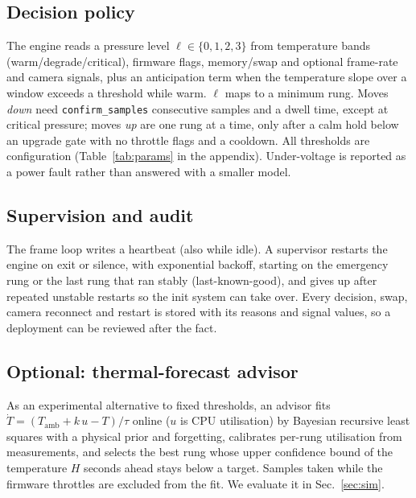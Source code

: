 \subsection{Decision policy}
The engine reads a pressure level $\ell\in\{0,1,2,3\}$ from temperature bands
(warm/degrade/critical), firmware flags, memory/swap and optional frame-rate and
camera signals, plus an anticipation term when the temperature slope over a
window exceeds a threshold while warm. $\ell$ maps to a minimum rung. Moves
\emph{down} need \texttt{confirm\_samples} consecutive samples and a dwell
time, except at critical pressure; moves \emph{up} are one rung at a time, only
after a calm hold below an upgrade gate with no throttle flags and a cooldown.
All thresholds are configuration (Table~\ref{tab:params} in the appendix).
Under-voltage is reported as a power fault rather than answered with a smaller
model.

\subsection{Supervision and audit}
The frame loop writes a heartbeat (also while idle). A supervisor restarts the
engine on exit or silence, with exponential backoff, starting on the emergency
rung or the last rung that ran stably (last-known-good), and gives up after
repeated unstable restarts so the init system can take over. Every decision,
swap, camera reconnect and restart is stored with its reasons and signal
values, so a deployment can be reviewed after the fact.

\subsection{Optional: thermal-forecast advisor}
As an experimental alternative to fixed thresholds, an advisor fits
$\dot T=(T_{\mathrm{amb}}+k\,u-T)/\tau$ online ($u$ is CPU utilisation) by
Bayesian recursive least squares with a physical prior and forgetting, calibrates
per-rung utilisation from measurements, and selects the best rung whose upper
confidence bound of the temperature $H$ seconds ahead stays below a target. Samples
taken while the firmware throttles are excluded from the fit. We evaluate it
in Sec.~\ref{sec:sim}.
